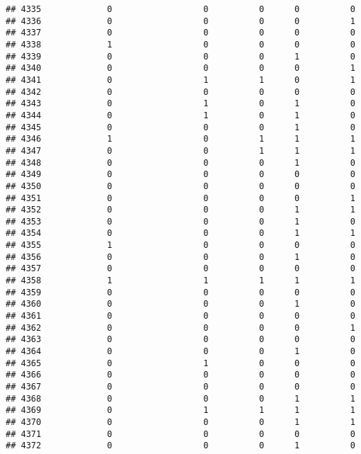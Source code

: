 \documentclass[
]{article}
\begin{document}
\begin{verbatim}
## 4335             0                  0          0      0          0
## 4336             0                  0          0      0          1
## 4337             0                  0          0      0          0
## 4338             1                  0          0      0          0
## 4339             0                  0          0      1          0
## 4340             0                  0          0      0          1
## 4341             0                  1          1      0          1
## 4342             0                  0          0      0          0
## 4343             0                  1          0      1          0
## 4344             0                  1          0      1          0
## 4345             0                  0          0      1          0
## 4346             1                  0          1      1          1
## 4347             0                  0          1      1          1
## 4348             0                  0          0      1          0
## 4349             0                  0          0      0          0
## 4350             0                  0          0      0          0
## 4351             0                  0          0      0          1
## 4352             0                  0          0      1          1
## 4353             0                  0          0      1          0
## 4354             0                  0          0      1          1
## 4355             1                  0          0      0          0
## 4356             0                  0          0      1          0
## 4357             0                  0          0      0          0
## 4358             1                  1          1      1          1
## 4359             0                  0          0      0          0
## 4360             0                  0          0      1          0
## 4361             0                  0          0      0          0
## 4362             0                  0          0      0          1
## 4363             0                  0          0      0          0
## 4364             0                  0          0      1          0
## 4365             0                  1          0      0          0
## 4366             0                  0          0      0          0
## 4367             0                  0          0      0          0
## 4368             0                  0          0      1          1
## 4369             0                  1          1      1          1
## 4370             0                  0          0      1          1
## 4371             0                  0          0      0          0
## 4372             0                  0          0      1          0

\end{verbatim}
\end{document}
